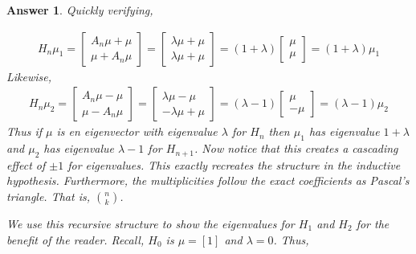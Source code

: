 \documentclass[12pt]{article}
\theoremstyle{colon}
\newtheorem*{answer}{Answer}
\begin{document}
\begin{answer}
  Quickly verifying,

  \begin{gather*}
    H_n \mu_1 = \begin{bmatrix}
      A_n \mu + \mu \\
      \mu + A_n \mu
    \end{bmatrix}  =
    \begin{bmatrix}
      \lambda \mu + \mu \\
      \lambda \mu + \mu
    \end{bmatrix} = (1+\lambda)
    \begin{bmatrix}
      \mu \\
      \mu
    \end{bmatrix} = (1+\lambda)\mu_1
  \end{gather*}
  Likewise,
  \begin{gather*}
    H_n \mu_2 = \begin{bmatrix}
      A_n \mu - \mu \\
      \mu - A_n \mu
    \end{bmatrix}  =
    \begin{bmatrix}
      \lambda \mu - \mu \\
      -\lambda \mu + \mu
    \end{bmatrix} = (\lambda-1)
    \begin{bmatrix}
      \mu \\
      -\mu
    \end{bmatrix} = (\lambda-1)\mu_2
  \end{gather*}
  Thus if $\mu$ is en eigenvector with eigenvalue $\lambda$ for $H_n$ then $\mu_1$ has eigenvalue $1+\lambda$ and $\mu_2$ has eigenvalue $\lambda-1$ for $H_{n+1}$. Now notice that this creates a cascading effect of $\pm 1$ for eigenvalues. This exactly recreates the structure in the inductive hypothesis. Furthermore, the multiplicities follow the exact coefficients as Pascal's triangle. That is, $\binom{n}{k}$.

  We use this recursive structure to show the eigenvalues for $H_1$ and $H_2$ for the benefit of the reader. Recall, $H_0$ is $\mu = [1]$ and $\lambda = 0$. Thus,


\end{answer}
\end{document}
